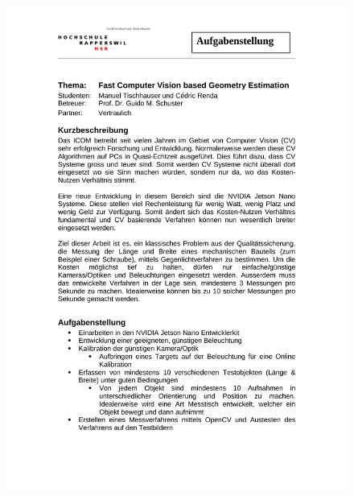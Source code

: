 \begin{figure}[H]
	\centering
	\includegraphics[trim= 0cm 0cm 0cm 0cm,page=2,width=13cm]{FastCVbasedGeometryEstimation.pdf}
\end{figure}


